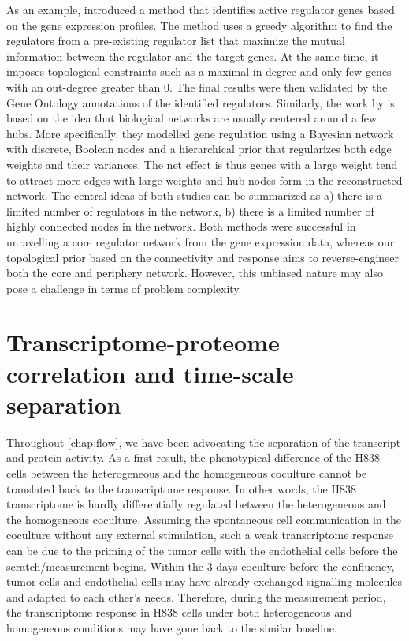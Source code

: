 As an example, \cite{Pe'er2002} introduced a method that
identifies active regulator genes based on the gene expression
profiles. The method uses a greedy algorithm to find the 
regulators from a pre-existing 
regulator list that maximize the mutual information between 
the regulator and the target genes. At the same time, it 
imposes topological constraints such
as a maximal in-degree and only few genes with an out-degree
greater than 0. The final results were then validated by
the Gene Ontology annotations of the identified regulators.
Similarly, the work by \cite{Boeck2012} is based on the idea 
that biological 
networks are usually centered around a few hubs. More specifically, they modelled gene regulation using a Bayesian network with discrete, Boolean nodes and a hierarchical prior that
regularizes both edge weights and their variances. The net effect is thus genes with a large weight tend to attract more
edges with large weights and hub nodes form in the 
reconstructed network. The central ideas of both studies 
can be summarized as a) there is a limited number
of regulators in the network, b) there is a limited number
of highly connected nodes in the network. Both methods were
successful in unravelling a core regulator network from the
gene expression data, whereas our topological prior based on
the connectivity and response aims to reverse-engineer both
the core and periphery network. However, this unbiased
nature may also pose a challenge in terms of problem
complexity.

\section{Transcriptome-proteome correlation and time-scale 
separation}
Throughout \ref{chap:flow}, we have been advocating the 
separation of the transcript and protein activity. As a first
result, the phenotypical difference of the H838 cells between
the heterogeneous and the homogeneous coculture cannot be
translated back to the transcriptome response. In other words,
the H838 transcriptome is hardly differentially regulated
between the heterogeneous and the homogeneous coculture. 
Assuming the spontaneous cell communication in the coculture
without any external stimulation,
such a weak transcriptome response can be due to the priming
of the tumor cells with the endothelial cells before the
scratch/measurement begins. Within the 3 days coculture
before the confluency, tumor cells and endothelial cells
may have already exchanged signalling molecules and adapted
to each other's needs. Therefore, during the measurement
period, the transcriptome response in H838 cells 
under both heterogeneous and homogeneous conditions
may have gone back to the similar baseline.

